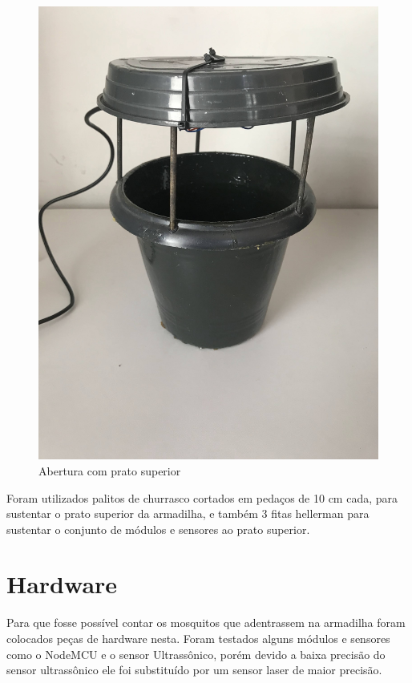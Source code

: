 \documentclass[
	12pt,				%
	openright,			%
	oneside,			%
	a4paper,			%
	chapter=TITLE,		%
	english,			%
	brazil				%
	]{abntex2}
\begin{document}
\begin{figure}[H]
    \centering
    \includegraphics[scale=0.04, angle=-90]{imagens/IMG_0604.jpg}
    \caption{Abertura com prato superior}
    \label{fig:abertura}
\end{figure}   

Foram utilizados palitos de churrasco cortados em pedaços de 10 cm cada, para sustentar o prato superior da armadilha, e também 3 
fitas hellerman para sustentar
o conjunto de módulos e sensores ao prato superior. 


\section{Hardware}

Para que fosse possível contar os mosquitos que adentrassem na armadilha foram colocados peças de hardware nesta.
Foram testados alguns módulos e sensores como o NodeMCU e o sensor Ultrassônico, porém devido a baixa precisão do sensor ultrassônico ele 
foi substituído por um sensor laser de maior precisão.
\end{document}
